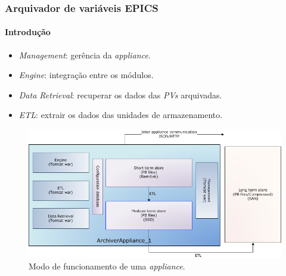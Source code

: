 \documentclass{beamer}
\begin{document}
\begin{frame}
\frametitle {Arquivador de variáveis EPICS}
\framesubtitle{Introdução} 

\begin{itemize}
  \item \textit{Management}: gerência da \textit{appliance}.
  \item \textit{Engine}: integração entre os módulos.
  \item \textit{Data Retrieval}: recuperar os dados das \textit{PVs} arquivadas.
  \item \textit{ETL}: extrair os dados das unidades de armazenamento.

\end{itemize}

\begin{figure}[h]

    \centering
    \includegraphics[scale=0.3]{image/applarch}
    \caption {Modo de funcionamento de uma \textit{appliance}.}
    \label{fig:epics_archiver}
\end{figure}

\end{frame}

\end{document}
